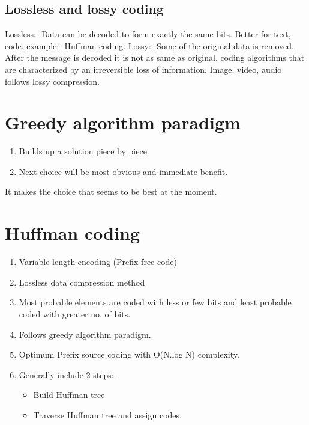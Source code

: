 \documentclass[10pt,a4paper]{article}
\begin{document}
 \subsection{Lossless and lossy coding}
 Lossless:- Data can be decoded to form exactly the same bits. Better for text, code. example:- Huffman coding. \newline
 Lossy:- Some of the original data is removed. After the message is decoded it is not as same as original. coding algorithms that are characterized by an irreversible loss of information. Image, video, audio follows lossy compression. 
\section{Greedy algorithm paradigm }
\begin{enumerate}
	\item  Builds up a solution piece by piece.
	\item Next choice will be most obvious and immediate benefit.
\end{enumerate} 

It makes the choice that seems to be best at the moment.

\section{Huffman coding}
\begin{enumerate}
	\item  Variable length encoding (Prefix free code)
	\item Lossless data compression method
	\item Most probable elements are coded with less or few bits and least probable coded with greater no. of bits. 
	\item Follows greedy algorithm paradigm. 
	\item Optimum Prefix source coding with  O(N.log N) complexity.
	\item Generally include 2 steps:-
	\begin{itemize}
		\item Build Huffman tree 
		\item Traverse Huffman tree and assign codes.
	\end{itemize}
\end{enumerate} 
\end{document}
